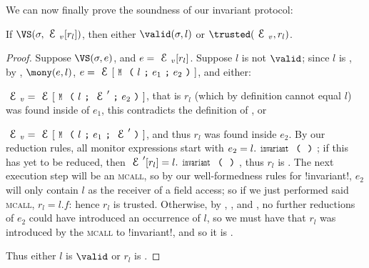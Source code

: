 \setcounter{theorem}{0}\LS
We can now finally prove the soundness of our invariant protocol:
\SS
\begin{theorem}[Soundness]\rm
If $\VS(\s, \EV[r_l])$, then either $\valid(\s,l)$ or $\trusted(\EV,r_l)$.
\end{theorem}\SS
\begin{proof}
\noindent Suppose $\VS(\s, e)$, and $e = \EV[r_l]$. Suppose $l$ is not $\valid$; since $l$ is \reach, by , $\mony(e,l)$, $e = \E[\M{l}{e_1}{e_2}]$, and either:
\begin{iitemize}
	\item $\EV = \E[\M{l}{\E'}{e_2}]$, that is $r_l$ (which by definition cannot equal $l$) was found inside of $e_1$, this contradicts the definition of \mony, or
	\item $\EV = \E[\M{l}{e_1}{\E'}]$, and thus $r_l$ was found inside $e_2$. By our reduction rules, all monitor expressions start with $e_2=l.\invariant$; if this has yet to be reduced, then $\E'[r_l] = l.\invariant$, thus $r_l$ is \trusted. The next execution step will be an \textsc{mcall}, so by our well-formedness rules for \Q!invariant!, $e_2$ will only contain $l$ as the receiver of a field access; so if we just performed said \textsc{mcall}, $r_l = l.f$: hence $r_l$ is trusted. Otherwise, by , , and \HNC, no further reductions of $e_2$ could have introduced an occurrence of $l$, so we must have that $r_l$ was introduced by the \textsc{mcall} to \Q!invariant!, and so it is \trusted.
\end{iitemize}
Thus either $l$ is $\valid$ or $r_l$ is \trusted.
\end{proof}
